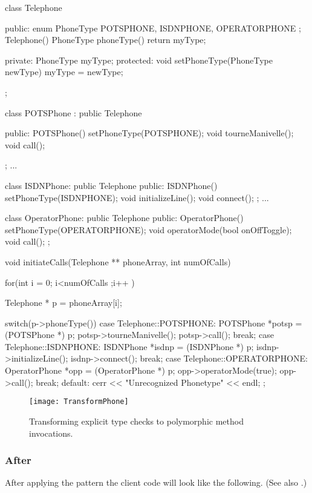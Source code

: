 \documentclass[a4paper,10pt,twoside]{book}
\begin{document}
\begin{code}
class Telephone {
public:
	enum PhoneType {
		POTSPHONE, ISDNPHONE, OPERATORPHONE
		};
	Telephone() {}
	PhoneType phoneType() { return myType; }

private:
	PhoneType myType;
protected: 
	void setPhoneType(PhoneType newType) { myType = newType; }
};

class POTSPhone : public Telephone {

public: 
	POTSPhone() { setPhoneType(POTSPHONE); }
	void tourneManivelle();
	void call();
};
...

class ISDNPhone: public Telephone {
public:
	ISDNPhone() { setPhoneType(ISDNPHONE);}
	void initializeLine();
	void connect();
};
...

class OperatorPhone: public Telephone {
public: 
	OperatorPhone() { setPhoneType(OPERATORPHONE); }
	void operatorMode(bool onOffToggle);
	void call();
};

void initiateCalls(Telephone ** phoneArray, int numOfCalls) {
	for(int i = 0; i<numOfCalls ;i++ ) {
		Telephone * p = phoneArray[i];

		switch(p->phoneType()) {
		case Telephone::POTSPHONE: {
			POTSPhone *potsp = (POTSPhone *) p;
			potsp->tourneManivelle();
			potsp->call();
			break;
		}
		case Telephone::ISDNPHONE: {
			ISDNPhone *isdnp = (ISDNPhone *) p;
			isdnp->initializeLine();
			isdnp->connect();
			break;
		}
		case Telephone::OPERATORPHONE: {
			OperatorPhone *opp = (OperatorPhone *) p;
			opp->operatorMode(true);
			opp->call();
			break;
		}
		default:	cerr << "Unrecognized Phonetype" << endl;
		};
	}
}
\end{code}

\begin{figure}
\begin{center}
\texttt{[image: TransformPhone]}
\caption{Transforming explicit type checks to polymorphic method invocations.}
\end{center}
\end{figure}

\subsubsection*{After}

After applying the pattern the client code will look like the following.
(See also .)
\end{document}
